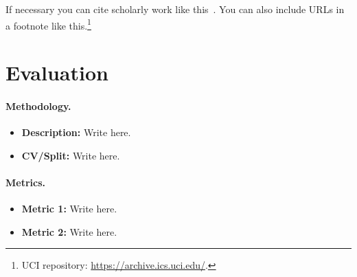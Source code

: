 \documentclass[10pt]{article}
\begin{document}
If necessary you can cite scholarly work like this~\cite{murphy2022probabilistic}. You can also include URLs in a footnote like this.\footnote{UCI repository: \url{https://archive.ics.uci.edu/}.}


\section*{Evaluation}

\paragraph{Methodology.} 

\begin{itemize}

\item {\bf Description: } Write here. %

\item {\bf CV/Split: } Write here. %

\end{itemize}


\paragraph{Metrics.} 

\begin{itemize}

\item {\bf Metric 1: } Write here. %

\item {\bf Metric 2: } Write here. %

\end{itemize}
\end{document}
